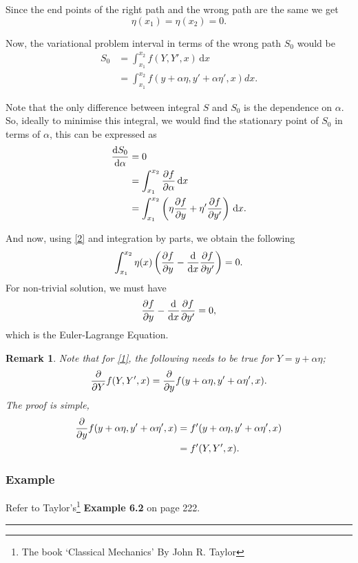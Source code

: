\documentclass[12pt,english]{article}
\newcommand{\dmr}[1]{\, \mathrm{d}#1} %
\newcommand{\intt}[2]{\int_{#1}^{#2}} %
\newtheorem{remark}{Remark}[subsubsection]
\numberwithin{equation}{subsection}
\begin{document}
Since the end points of the right path and the wrong path are the same we get
\begin{equation}
    \eta(x_1) = \eta(x_2) = 0.\label{2}    
\end{equation}

Now, the variational problem interval in terms of the wrong path $S_0$ would be
\begin{align}
    S_0 &= \intt{x_1}{x_2} f(Y,Y',x) \dmr{x} \nonumber \\
    &= \intt{x_1}{x_2} f(y+\alpha \eta, y' + \alpha \eta', x)dx.
\end{align}

Note that the only difference between integral $S$ and $S_0$ is the dependence on $\alpha$. So, ideally to minimise this integral, we would find the stationary point of $S_0$ in terms of $\alpha$, this can be expressed as 
\begin{align}
    \dv{S_0}{\alpha} &= 0 \nonumber \\
    &= \intt{x_1}{x_2} \pdv{f}{\alpha} \dmr{x} \nonumber \\
    &= \intt{x_1}{x_2} \left(\eta \pdv{f}{y} + \eta' \pdv{f}{y'} \right) \dmr{x}.\label{1}
\end{align}

And now, using \eqref{2} and integration by parts, we obtain the following
\begin{equation}
    \intt{x_1}{x_2}\eta(x)\left(\pdv{f}{y}-\dv{x}\pdv{f}{y'}\right) = 0.
\end{equation}
For non-trivial solution, we must have 
\[
    \pdv{f}{y}-\dv{x}\pdv{f}{y'} = 0,
\]
which is the Euler-Lagrange Equation.

\begin{remark}
    Note that for \eqref{1}, the following needs to be true for $Y = y + \alpha \eta$;
    \[
        \pdv{}{Y} f(Y,Y',x) = \pdv{}{y} f(y+\alpha \eta, y'+\alpha \eta', x).
    \]
    The proof is simple,
    \begin{align*}
        \pdv{}{y} f(y+\alpha \eta, y'+\alpha \eta', x) &= f'(y+\alpha \eta, y'+\alpha \eta', x) \\
        &= f'(Y, Y', x).
    \end{align*}
\end{remark}

\subsubsection{Example}
Refer to Taylor's\footnote{The book `Classical Mechanics'\cite{TaylorJohnR.JohnRobert2005Cm} By John R. Taylor} \textbf{Example 6.2} on page 222.
\par\noindent\rule{\textwidth}{0.4pt}
\end{document}
